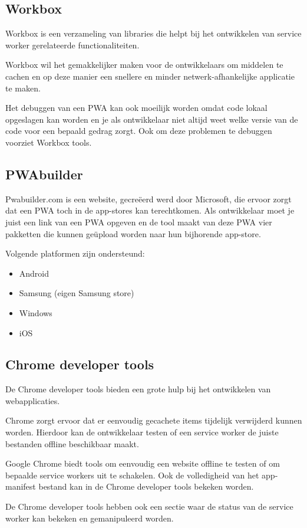 		

\subsection{Workbox}

	Workbox is een verzameling van libraries die helpt bij het ontwikkelen van service worker gerelateerde functionaliteiten.
	
	Workbox wil het gemakkelijker maken voor de ontwikkelaars om middelen te cachen en op deze manier een snellere en minder netwerk-afhankelijke applicatie te maken.
	
	Het debuggen van een PWA kan ook moeilijk worden omdat code lokaal opgeslagen kan worden en je als ontwikkelaar niet altijd weet welke versie van de code voor een bepaald gedrag zorgt. Ook om deze problemen te debuggen voorziet Workbox tools.
	\autocite{Workbox2020}
	

\subsection{PWAbuilder}

	Pwabuilder.com is een website, gecreëerd werd door Microsoft, die ervoor zorgt dat een PWA toch in de app-stores kan terechtkomen. Als ontwikkelaar moet je juist een link van een PWA opgeven en de tool maakt van deze PWA vier pakketten die kunnen geüpload worden naar hun bijhorende app-store. 
	
	Volgende platformen zijn ondersteund:
	
	\begin{itemize}
		\item	Android
		\item	Samsung (eigen Samsung store)
		\item	Windows
		\item	iOS
	\end{itemize}
	\autocite{PWAbuilder2020}
	
	
\subsection{Chrome developer tools}
	De Chrome developer tools bieden een grote hulp bij het ontwikkelen van webapplicaties.
	
	Chrome zorgt ervoor dat er eenvoudig gecachete items tijdelijk verwijderd kunnen worden. Hierdoor kan de ontwikkelaar testen of een service worker de juiste bestanden offline beschikbaar maakt.
	
	Google Chrome biedt tools om eenvoudig een website offline te testen of om bepaalde service workers uit te schakelen.
	Ook de volledigheid van het app-manifest bestand kan in de Chrome developer tools bekeken worden.
	
	De Chrome developer tools hebben ook een sectie waar de status van de service worker kan bekeken en gemanipuleerd worden.
	\autocite{Developers2019b}
	

	
	